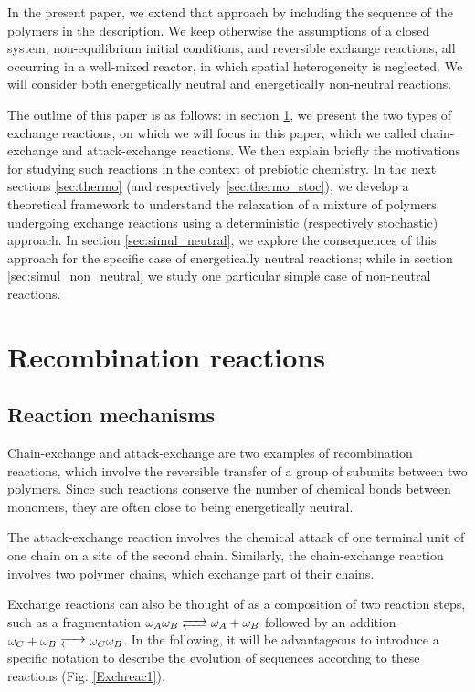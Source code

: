 \documentclass[
	amsmath,
	amssymb,
	a4paper,
	aip,		%
	jcp,		%
	reprint, twocolumn  %
	fleqn,
	showpacs,
	floatfix
]{revtex4-1}
\begin{document}
In the present paper, we extend that approach by including the sequence of the polymers in the description. 
We keep otherwise the assumptions of a closed system, non-equilibrium initial conditions, 
and reversible exchange reactions, all occurring in a well-mixed reactor, in which spatial heterogeneity is neglected.
We will consider both energetically neutral and energetically non-neutral reactions. 

The outline of this paper is as follows: in section \ref{sec:mechanism}, we present the two types of exchange reactions, on which we will focus  
in this paper, which we called chain-exchange and attack-exchange reactions.
We then explain briefly the motivations for studying such reactions in the context of prebiotic chemistry.
In the next sections \ref{sec:thermo} (and respectively \ref{sec:thermo_stoc}), we develop a theoretical framework to understand the 
relaxation of a mixture of polymers undergoing exchange reactions using a deterministic (respectively stochastic) approach.
In section \ref{sec:simul_neutral}, we explore the consequences of this approach for the specific case of 
energetically neutral reactions; while in section \ref{sec:simul_non_neutral} we study one particular simple case of 
non-neutral reactions.


\section{Recombination reactions}
\label{sec:mechanism}

\subsection{Reaction mechanisms}

Chain-exchange and attack-exchange are two examples of recombination reactions, which 
involve the reversible transfer of a group of subunits between two polymers. Since such reactions conserve the number 
of chemical bonds between monomers,
they are often close to being energetically neutral.

The attack-exchange reaction involves the chemical attack of one terminal unit of one chain 
on a site of the second chain. Similarly, the chain-exchange reaction involves two polymer chains, which exchange part of their chains.

Exchange reactions can also be thought of as a composition of two reaction steps, such as a fragmentation 
$\omega_{A}\omega_{B}   \ce{<-->} \omega_{A} + \omega_{B}$ followed by an addition $\omega_{C} + \omega_{B}   \ce{<-->} \omega_{C}\omega_{B}$. 
In the following, it will be advantageous to introduce a specific notation to describe the evolution of sequences according to these reactions (Fig. \ref{Exchreac1}). 
\end{document}
